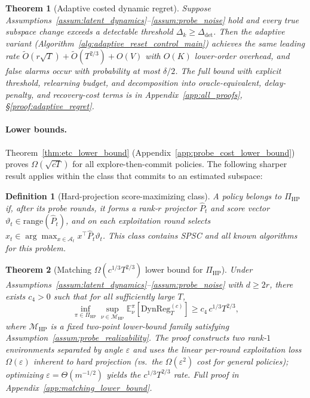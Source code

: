 \documentclass{article}
\newcommand{\E}{\mathbb{E}}
\newcommand{\cA}{\mathcal{A}}
\newcommand{\DynReg}{\mathrm{DynReg}}
\newcommand{\range}{\mathrm{range}}
\newtheorem{definition}{Definition}
\newtheorem{theorem}{Theorem}
\begin{document}
  \begin{theorem}[Adaptive costed dynamic regret]
  \label{thm:adaptive_regret}
  Suppose Assumptions~\ref{assum:latent_dynamics}--\ref{assum:probe_noise} hold and every true subspace change
  exceeds a detectable threshold $\Delta_k \ge \Delta_{\mathrm{det}}$.
  Then the adaptive variant (Algorithm~\ref{alg:adaptive_reset_control_main}) achieves the same
  leading rate $\widetilde O(r\sqrt{T}) + \widetilde O(T^{2/3}) + O(V)$ with $O(K)$ lower-order overhead,
  and false alarms occur with probability at most $\delta/2$.
  The full bound with explicit threshold, relearning budget, and decomposition into
  oracle-equivalent, delay-penalty, and recovery-cost terms is in
  Appendix~\ref{app:all_proofs}, \S\ref{proof:adaptive_regret}.
  \end{theorem}

  \paragraph{Lower bounds.}
  Theorem~\ref{thm:etc_lower_bound} (Appendix~\ref{app:probe_cost_lower_bound}) proves $\Omega(\sqrt{cT})$ for all explore-then-commit policies.
  The following sharper result applies within the class that commits to an estimated subspace:

  \begin{definition}[Hard-projection score-maximizing class]
  \label{def:hard_projection_policy_class}
  A policy belongs to $\Pi_{\mathrm{HP}}$ if, after its probe rounds, it forms
  a rank-$r$ projector $\widehat{P}_t$ and score vector
  $\vartheta_t \in \range(\widehat{P}_t)$, and on each exploitation round
  selects $x_t \in \arg\max_{x \in \cA_t} x^\top \widehat{P}_t \vartheta_t$.
  This class contains SPSC and all known algorithms for this problem.
  \end{definition}

  \begin{theorem}[Matching $\Omega(c^{1/3}T^{2/3})$ lower bound for $\Pi_{\mathrm{HP}}$]
  \label{thm:probe_rate_lb}
  Under Assumptions~\ref{assum:latent_dynamics}--\ref{assum:probe_noise} with $d \ge 2r$, there exists $c_4 > 0$ such that
  for all sufficiently large $T$,
  \[
  \inf_{\pi \in \Pi_{\mathrm{HP}}}
  \sup_{\nu \in \mathcal{M}_{\mathrm{HP}}}
  \E_\nu^\pi\!\left[\DynReg_T^{(c)}\right]
  \ge c_4\, c^{1/3} T^{2/3},
  \]
  where $\mathcal{M}_{\mathrm{HP}}$ is a fixed two-point lower-bound family satisfying
  Assumption~\ref{assum:probe_realizability}. The proof constructs two
  rank-$1$ environments separated by angle $\varepsilon$ and uses the linear
  per-round exploitation loss $\Omega(\varepsilon)$ inherent to hard projection
  (vs.\ the $\Omega(\varepsilon^2)$ cost for general policies); optimizing
  $\varepsilon = \Theta(m^{-1/2})$ yields the $c^{1/3}T^{2/3}$ rate.
  Full proof in Appendix~\ref{app:matching_lower_bound}.
  \end{theorem}
\end{document}
